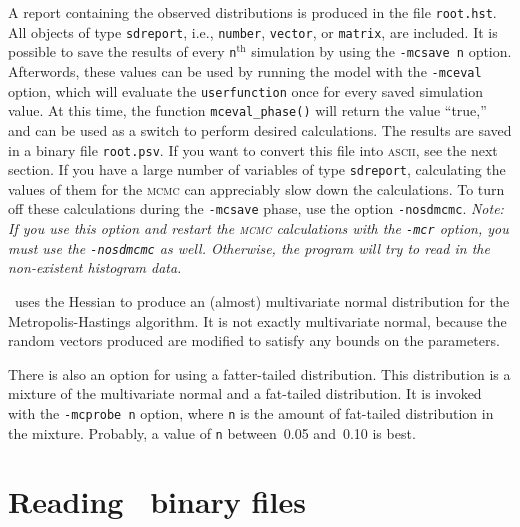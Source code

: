 \documentclass{admbmanual}
\begin{document}
A report containing the observed distributions is produced in the file
\texttt{root.hst}. All objects of type \texttt{sdreport}, i.e., \texttt{number},
\texttt{vector}, or \texttt{matrix}, are included.
It is possible to save the results of every \texttt{n}$^\textrm{th}$ simulation
by using the \texttt{-mcsave n} option. Afterwords, these values can be used by
running the model with the \texttt{-mceval} option, which will evaluate the
\texttt{userfunction} once for every saved simulation value. At this time, the
function \texttt{mceval\_phase()} will return the value ``true,'' and can be
used as a switch to perform desired calculations. The results are saved in a
binary file \texttt{root.psv}. If you want to convert this file into
\textsc{ascii}, see the next section. If you have a large number of variables of
type \texttt{sdreport}, calculating the values of them for the \textsc{mcmc} can
appreciably slow down the calculations. To turn off these calculations during
the \texttt{-mcsave} phase, use the option \texttt{-nosdmcmc}. {\it Note: If you
  use this option and restart the \textsc{mcmc} calculations with the
  \texttt{-mcr} option, you must use the \texttt{-nosdmcmc} as well. Otherwise,
  the program will try to read in the non-existent histogram data.}

\ADM\ uses the Hessian to produce an (almost) multivariate normal distribution
for the Metropolis-Hastings algorithm. It is not exactly multivariate normal,
because the random vectors produced are modified to satisfy any bounds on the
parameters.

There is also an option for using a fatter-tailed distribution. This
distribution is a mixture of the multivariate normal and a fat-tailed
distribution. It is invoked with the \texttt{-mcprobe n} option, where
\texttt{n} is the amount of fat-tailed distribution in the mixture. Probably, a
value of \texttt{n} between~0.05 and~0.10 is best.

\section{Reading \ADM\ binary files}
\end{document}
